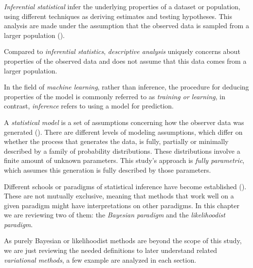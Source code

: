 
\emph{Inferential statistical} infer the underlying properties of a dataset or population, using different techniques as deriving estimates and testing hypotheses. This analysis are made under the assumption that the observed data is sampled from a larger population (\cite{upton2014dictionary}).

Compared to \emph{inferential statistics}, \emph{descriptive analysis} uniquely concerns about properties of the observed data and does not assume that this data comes from a larger population.

In the field of \emph{machine learning}, rather than inference, the procedure for deducing properties of the model is commonly referred to as \emph{training or learning}, in contrast, \emph{inference} refers to using a model for prediction.

A \emph{statistical model} is a set of assumptions concerning how the observer data was generated (\cite{cox2006principles}). There are different levels of modeling assumptions, which differ on whether the process that generates the data, is fully, partially or minimally described by a family of probability distributions. These distributions involve a finite amount of unknown parameters. This study's approach is \emph{fully parametric}, which assumes this generation is fully described by those parameters.

Different schools or paradigms of statistical inference have become established (\cite{bandyopadhyay2011philosophy}). These are not mutually exclusive, meaning that methods that work well on a given paradigm might have interpretations on other paradigms. In this chapter we are reviewing two of them: the \emph{Bayesian paradigm} and the \emph{likelihoodist paradigm}.

As purely Bayesian or likelihoodist methods are beyond the scope of this study, we are just reviewing the needed definitions to later understand related \emph{variational methods}, a few example are analyzed in each section.
